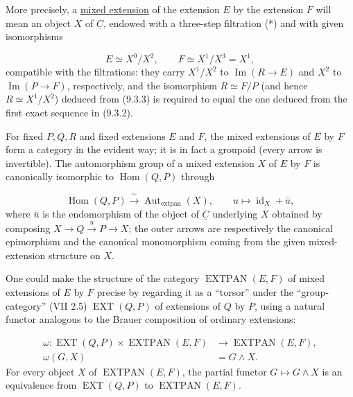 More precisely, a \underline{mixed extension} of the extension $E$ by the
extension $F$ will mean an object $X$ of $\underline C$, endowed with a
three-step filtration (*) and with given isomorphisms

\begin{equation}\tag{9.3.3}
E\simeq X^0/X^2,
\qquad F\simeq X^1/X^3=X^1,
\end{equation}
compatible with the filtrations: they carry $X^1/X^2$ to
$\operatorname{Im}(R\longrightarrow E)$ and $X^2$ to
$\operatorname{Im}(P\longrightarrow F)$, respectively, and the
isomorphism $R\simeq F/P$ (and hence $R\simeq X^1/X^2$) deduced from
(9.3.3) is required to equal the one deduced from the first exact sequence
in (9.3.2).

For fixed $P,Q,R$ and fixed extensions $E$ and $F$, the mixed extensions of
$E$ by $F$ form a category in the evident way; it is in fact a groupoid
(every arrow is invertible). The automorphism group of a mixed extension
$X$ of $E$ by $F$ is canonically isomorphic to $\operatorname{Hom}(Q,P)$
through

\begin{equation}\tag{9.3.4}
\operatorname{Hom}(Q,P)
 \xrightarrow{\ \sim\ }
\operatorname{Aut}_{\mathrm{extpan}}(X),
\qquad
u\longmapsto\operatorname{id}_X+\bar u,
\end{equation}
where $\bar u$ is the endomorphism of the object of $\underline C$
underlying $X$ obtained by composing
$X\longrightarrow Q\xrightarrow{u}P\longrightarrow X$; the outer arrows
are respectively the canonical epimorphism and the canonical monomorphism
coming from the given mixed-extension structure on $X$.

One could make the structure of the category
$\operatorname{EXTPAN}(E,F)$ of mixed extensions of $E$ by $F$ precise by
regarding it as a ``torsor'' under the ``group-category'' (VII 2.5)
$\operatorname{EXT}(Q,P)$ of extensions of $Q$ by $P$, using a natural
functor analogous to the Brauer composition of ordinary extensions:

\begin{equation}\tag{9.3.5}
\begin{aligned}
\omega:
\operatorname{EXT}(Q,P)\times\operatorname{EXTPAN}(E,F)
 &\longrightarrow \operatorname{EXTPAN}(E,F),\\
\omega(G,X)&=G\wedge X.
\end{aligned}
\end{equation}
For every object $X$ of $\operatorname{EXTPAN}(E,F)$, the partial functor
$G\longmapsto G\wedge X$ is an equivalence from
$\operatorname{EXT}(Q,P)$ to $\operatorname{EXTPAN}(E,F)$.

